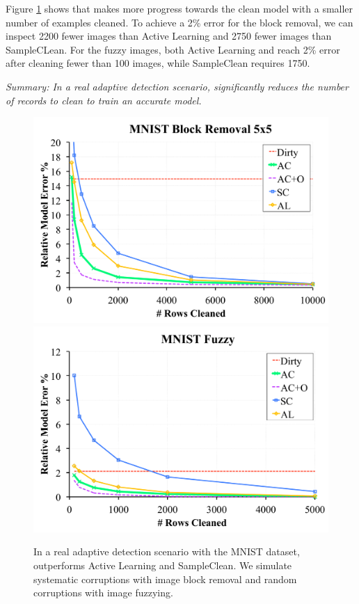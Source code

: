 \fi

Figure \ref{mnist} shows that \sys makes more progress towards the clean model with a smaller number of examples cleaned.
To achieve a 2\% error for the block removal, we can inspect 2200 fewer images than Active Learning and 2750 fewer images than SampleCLean.
For the fuzzy images, both Active Learning and \sys reach 2\% error after cleaning fewer than 100 images, while SampleClean requires 1750.

\vspace{0.25em}

\noindent \emph{Summary: In a real adaptive detection scenario, \sys significantly reduces the number of records to clean to train an accurate model. }

\begin{figure}[ht]
\centering
 \includegraphics[width=0.49\columnwidth]{exp/exp7a.pdf}
 \includegraphics[width=0.49\columnwidth]{exp/exp7b.pdf}
 \caption{In a real adaptive detection scenario with the MNIST dataset, \sys outperforms Active Learning and SampleClean. We simulate systematic corruptions with image block removal and random corruptions with image fuzzying.  \label{mnist}}
\end{figure}
